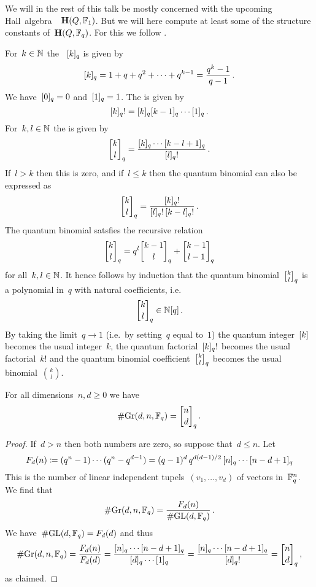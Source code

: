 \documentclass[a4paper,11pt]{scrartcl}
\begin{document}
We will in the rest of this talk be mostly concerned with the upcoming Hall~algebra~~$\mathbf{H}(Q, \mathbb{F}_1)$.
But we will here compute at least some of the structure constants of~$\mathbf{H}(Q, \mathbb{F}_q)$.
For this we follow \cite[Example~2.2]{schiffmann_hall}.


\begin{recall}
  For~$k \in \mathbb{N}$ the ~$[k]_q$ is given by
  \[
    [k]_q
    =
    1 + q + q^2 + \dotsb + q^{k-1}
    =
    \frac{q^k - 1}{q - 1} \,.
  \]
  We have~$[0]_q = 0$ and~$[1]_q = 1$.
  The  is given by
  \[
    [k]_q !
    =
    [k]_q [k-1]_q \dotsm [1]_q \,.
  \]
  For~$k, l \in \mathbb{N}$ the  is given by
  \[
    \qbinomial{k}{l}_q
    =
    \frac{\qnum{k}_q \dotsm \qnum{k-l+1}_q}{\qnum{l}_q!} \,.
  \]
  If~$l > k$ then this is zero, and if~$l \leq k$ then the quantum binomial can also be expressed as
  \[
    \qbinomial{k}{l}_q
    =
    \frac{\qnum{k}_q!}{\qnum{l}_q! \, \qnum{k-l}_q!} \,.
  \]
  The quantum binomial satsfies the recursive relation
  \[
    \qbinomial{k}{l}_q
    =
    q^l \qbinomial{k-1}{l}_q
    +
    \qbinomial{k-1}{l-1}_q
  \]
  for all~$k, l \in \mathbb{N}$.
  It hence follows by induction that the quantum binomial~$\qbinomial{k}{l}_q$ is a polynomial in~$q$ with natural coefficients, i.e.
  \[
    \qbinomial{k}{l}_q
    \in
    \Natural[q] \,.
  \]
  By taking the limit~$q \to 1$ (i.e.\ by setting~$q$ equal to~$1$) the quantum integer~$[k]$ becomes the usual integer~$k$, the quantum factorial~$[k]_q!$ becomes the usual factorial~$k!$ and the quantum binomial coefficient~$\qbinomial{k}{l}_q$ becomes the usual binomial~$\binom{k}{l}$.
\end{recall}

\begin{lemma}
  For all dimensions~$n, d \geq 0$ we have
  \[
    \counting {\Gr(d, n, \Finite_q)}
    =
    \qbinomial{n}{d}_q \,.
  \]
\end{lemma}

\begin{proof}
  If~$d > n$ then both numbers are zero, so suppose that~$d \leq n$.  
  Let
  \[
    F_d(n)
    \coloneqq
    (q^n - 1) \dotsm (q^n - q^{d-1})
    =
    (q-1)^d \, q^{d(d-1)/2} \, [n]_q \dotsm [n-d+1]_q
  \]
  This is the number of linear independent tupels~$(v_1, \dotsc, v_d)$ of vectors in~$\mathbb{F}_q^n$.
  We find that
  \[
    \# {\operatorname{Gr}(d, n, \mathbb{F}_q)}
    =
    \frac{ F_d(n) }{ \# {\operatorname{GL}(d, \mathbb{F}_q)} } \,.
  \]
  We have~$\# {\operatorname{GL}(d, \mathbb{F}_q)} = F_d(d)$ and thus
  \[
    \counting {\Gr(d, n, \Finite_q)}
    =
    \frac{ F_d(n) }{ F_d(d) }
    =
    \frac{ \qnum{n}_q \dotsm \qnum{n-d+1}_q }{ \qnum{d}_q \dotsm  \qnum{1}_q }
    =
    \frac{ \qnum{n}_q \dotsm \qnum{n-d+1}_q }{ \qnum{d}_q! }
    =
    \qbinomial{n}{d}_q \,,
  \]
  as claimed.
\end{proof}
\end{document}
